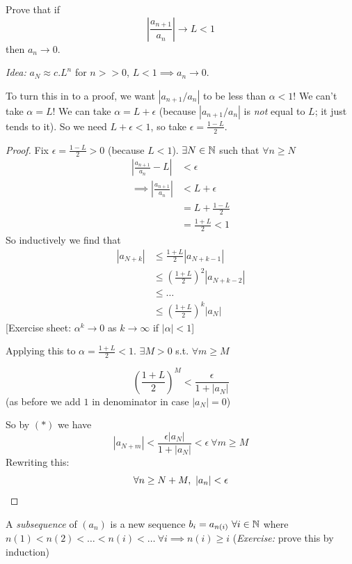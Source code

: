 \documentclass[10pt,twoside]{scrartcl}
\begin{document}
\begin{example}
Prove that if \[\left|\frac{a_{n+1}}{a_n}\right|\to L < 1\]
then $a_n \to 0$.

\emph{Idea:} $a_N \approx c.L^n$ for $n >> 0$, $L<1 \implies a_n \to 0$. 

To turn this in to a proof, we want $\left|a_{n+1}/a_n\right|$ to be less than $\alpha <1$! We can't take $\alpha = L$! We can take $\alpha = L + \epsilon$ (because $\left|a_{n+1}/a_n\right|$ is \emph{not} equal to $L$; it just tends to it). So we need $L + \epsilon < 1$, so take $\epsilon = \frac{1-L}{2}$.

\begin{proof}
Fix $\epsilon = \frac{1-L}{2} > 0$ (because $L < 1$). $\exists N \in\mathbb{N}$ such that $\forall n \geq N$
\begin{align*}
\left|\frac{a_{n+1}}{a_n} - L\right| &< \epsilon\\
\implies \left|\frac{a_{n+1}}{a_n}\right| &< L + \epsilon\\ &= L + \frac{1-L}{2}\\ &= \frac{1+L}{2} < 1
\end{align*}
So inductively we find that
\begin{align*}|a_{N+k}| &\leq \frac{1+L}{2} |a_{N+k-1}|\\
&\leq \left(\frac{1+L}{2}\right)^2 |a_{N+k-2}|\\
&\leq \dots\\ &\leq \left(\frac{1+L}{2}\right)^k |a_{N}| \tag{$*$}
\end{align*}
[Exercise sheet: $\alpha^k \to 0$ as $k \to \infty$ if $|\alpha| < 1$]

Applying this to $\alpha = \frac{1+L}{2} < 1$. $\exists M > 0$ s.t. $\forall m \geq M$

\[\left(\frac{1+L}{2}\right)^M < \frac{\epsilon}{1 + |a_N|}\]
(as before we add $1$ in denominator in case $|a_N| = 0$)

So by $(*)$ we have \[|a_{N+m}| < \dfrac{\epsilon|a_N|}{1 + |a_N|} < \epsilon~\forall m \geq M\] Rewriting this: 
\[\forall n \geq N+M,~ |a_n| < \epsilon\qedhere\]
\end{proof}
\end{example}

\vspace*{5pt}

\begin{definition}
A \emph{subsequence} of $(a_n)$ is a new sequence $b_i = a_{n(i)}~ \forall i \in\mathbb{N}$ where $n(1) < n(2) < \dots < n(i) < \dots ~\forall i \implies n(i) \geq i$ (\emph{Exercise:} prove this by induction)
\end{definition}
\end{document}
